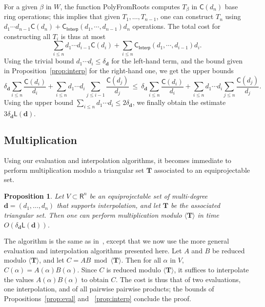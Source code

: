 \documentclass[amsthm]{elsart}
\def\d {\ensuremath{\mathbf{d}}}
\def\C {\ensuremath{\mathsf{C}}}
\def\L {\ensuremath{\mathsf{L}}}
\def\T {\ensuremath{\mathbf{T}}}
\def\rng {\ensuremath{\mathsf{R}}}
\def\Interp {\ensuremath{\mathsf{Interp}}}
\theoremstyle{plain}
\newtheorem{Proposition}{Proposition}
\begin{document}
\begin{pf}
For a given $\beta$ in $W$, the function {\sf PolyFromRoots} computes
$T_{\beta}$ in $\C(d_n)$ base ring operations; this implies that given
$T_1,\dots,T_{n-1}$, one can construct $T_n$ using $d_1\cdots d_{n-1}
\C(d_n) + \C_\Interp(d_1,\cdots,d_{n-1}) d_n$ operations. The total
cost for constructing all $T_i$ is thus at most
$$\sum_{i \le n} d_1\cdots d_{i-1} \C(d_i) + \sum_{i \le
n}\C_\Interp(d_1,\cdots,d_{i-1}) d_i.$$ Using the trivial bound $d_1
\cdots d_i \le \delta_\d$ for the left-hand term, and the bound given
in Proposition~\ref{prop:interp} for the right-hand one, we get the
upper bounds
$$\delta_\d\sum_{i \le n}  \frac{\C(d_i)}{d_i} + \sum_{i \le
n} d_1 \cdots d_i \sum_{j \le i-1} \frac {\C(d_j)}{d_j}\ \le \
\delta_\d\sum_{i \le n}  \frac{\C(d_i)}{d_i} + \sum_{i \le
n} d_1 \cdots d_i  \sum_{j \le n} \frac {\C(d_j)}{d_j}.
$$
Using the upper bound $\sum_{i \le n} d_1\cdots d_i \le 2 \delta_\d$,
we finally obtain the estimate $3 \delta_\d \L(\d)$.
\end{pf}



\subsection{Multiplication}\label{ssec:mult}

Using our evaluation and interpolation algorithms, it becomes
immediate to perform multiplication modulo a triangular set $\T$
associated to an equiprojectable set. 
\begin{Proposition}\label{prop:mul}
  Let $V \subset \rng^n$ be an equiprojectable set of multi-degree
  $\d=(d_1,\dots,d_n)$ that supports interpolation, and let $\T$ be
  the associated triangular set. Then one can perform multiplication
  modulo $\langle \T\rangle$ in time $O(\delta_\d \L(\d))$.
\end{Proposition}
\begin{pf}
  The algorithm is the same as in~\cite[Section~2.2]{LiMoSc07}, except
  that we now use the more general evaluation and interpolation
  algorithms presented here. Let $A$ and $B$ be reduced modulo
  $\langle \T \rangle$, and let $C=AB \bmod \langle \T \rangle$. Then
  for all $\alpha$ in $V$, $C(\alpha)=A(\alpha)B(\alpha)$. Since $C$
  is reduced modulo $\langle \T \rangle$, it suffices to interpolate
  the values $A(\alpha)B(\alpha)$ to obtain $C$.
The cost is thus that of two evaluations, one interpolation, and of
all pairwise pairwise products; the bounds of Propositions~\ref{prop:eval}
and ~\ref{prop:interp} conclude the proof.
\end{pf}
\end{document}
